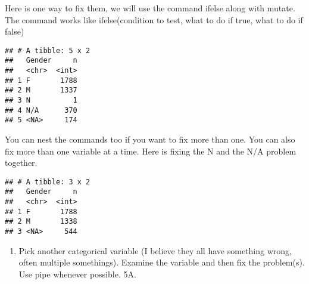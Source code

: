 \documentclass[
]{article}
\newenvironment{Shaded}{\begin{snugshade}}{\end{snugshade}}
\newcommand{\CommentTok}[1]{\textcolor[rgb]{0.56,0.35,0.01}{\textit{#1}}}
\newcommand{\DataTypeTok}[1]{\textcolor[rgb]{0.13,0.29,0.53}{#1}}
\newcommand{\KeywordTok}[1]{\textcolor[rgb]{0.13,0.29,0.53}{\textbf{#1}}}
\newcommand{\NormalTok}[1]{#1}
\newcommand{\OperatorTok}[1]{\textcolor[rgb]{0.81,0.36,0.00}{\textbf{#1}}}
\newcommand{\OtherTok}[1]{\textcolor[rgb]{0.56,0.35,0.01}{#1}}
\newcommand{\StringTok}[1]{\textcolor[rgb]{0.31,0.60,0.02}{#1}}
\providecommand{\tightlist}{%
  \setlength{\itemsep}{0pt}\setlength{\parskip}{0pt}}
\begin{document}
Here is one way to fix them, we will use the command ifelse along with
mutate. The command works like ifelse(condition to test, what to do if
true, what to do if false)

\begin{Shaded}
\end{Shaded}

\begin{verbatim}
## # A tibble: 5 x 2
##   Gender     n
##   <chr>  <int>
## 1 F       1788
## 2 M       1337
## 3 N          1
## 4 N/A      370
## 5 <NA>     174
\end{verbatim}

You can nest the commands too if you want to fix more than one. You can
also fix more than one variable at a time. Here is fixing the N and the
N/A problem together.

\begin{Shaded}
\end{Shaded}

\begin{verbatim}
## # A tibble: 3 x 2
##   Gender     n
##   <chr>  <int>
## 1 F       1788
## 2 M       1338
## 3 <NA>     544
\end{verbatim}

\begin{enumerate}
\def\labelenumi{\arabic{enumi}.}
\setcounter{enumi}{4}
\tightlist
\item
  Pick another categorical variable (I believe they all have something
  wrong, often multiple somethings). Examine the variable and then fix
  the problem(s). Use pipe whenever possible. 5A.
\end{enumerate}
\end{document}
